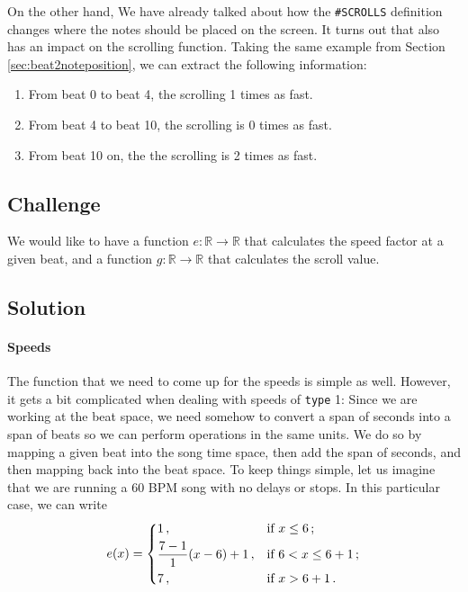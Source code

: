 \documentclass[a4paper,9pt]{article}
\begin{document}
    On the other hand, We have already talked about how the \texttt{\#SCROLLS} definition changes where the notes should be placed on the screen. It turns out that also has an impact on the scrolling function. Taking the same example from Section \ref{sec:beat2noteposition}, we can extract the following information:


    \begin{enumerate}
		\item From beat 0 to beat 4, the scrolling 1 times as fast.
		\item From beat 4 to beat 10, the scrolling is 0 times as fast.
		\item From beat 10 on, the the scrolling is 2 times as fast.
    \end{enumerate}
    \subsection{Challenge}

    We would like to have a function $ e: \mathbb{R}\rightarrow \mathbb{R} $ that calculates the speed factor at a given beat, and a function $ g: \mathbb{R}\rightarrow \mathbb{R} $ that calculates the scroll value.

    \subsection{Solution}

\paragraph{Speeds}

The function that we need to come up for the speeds is simple as well. However, it gets a bit complicated when dealing with speeds of \texttt{type} 1:
Since we are working at the beat space, we need somehow to convert a span of seconds into a span of beats so we can perform operations in the same units. We do so by mapping a given beat into the song time space, then add the span of seconds, and then mapping back into the beat space. To keep things simple, let us imagine that we are running a 60 BPM song with no delays or stops.
In this particular case, we can write 
\begin{equation}
	e(x) = \begin{dcases}
		1\,, & \text{if $ x \leq 6 $}\,;\\
		\frac{7-1}{1}(x-6)+1\,, & \text{if $ 6 < x \leq 6+1 $}\,;\\
		7\,, & \text{if $ x > 6+1 $}\,.
	\end{dcases}
	\label{eq:example-speeds}
\end{equation}
\end{document}
